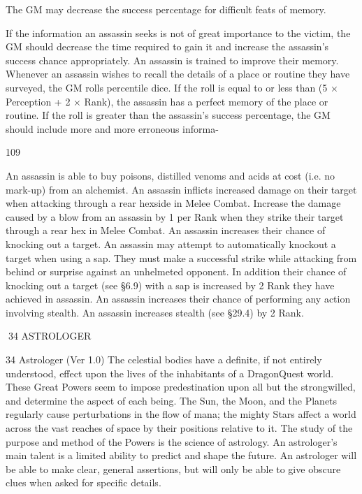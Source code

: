 \documentclass[a4paper]{article}
\begin{document}
\begin{multicols}{3}
The GM may decrease the success percentage for
difficult feats of memory.

If the information an assassin seeks is not of great
importance to the victim, the GM should decrease
the time required to gain it and increase the assassin’s success chance appropriately.
An assassin is trained to improve their memory.
Whenever an assassin wishes to recall the details of
a place or routine they have surveyed, the GM rolls
percentile dice. If the roll is equal to or less than (5
× Perception + 2 × Rank), the assassin has a perfect
memory of the place or routine. If the roll is greater
than the assassin’s success percentage, the GM
should include more and more erroneous informa-

109

An assassin is able to buy poisons, distilled venoms and acids at cost (i.e. no mark-up) from an
alchemist.
An assassin inflicts increased damage on their
target when attacking through a rear hexside in
Melee Combat.
Increase the damage caused by a blow from an
assassin by 1 per Rank when they strike their target
through a rear hex in Melee Combat.
An assassin increases their chance of knocking
out a target.
An assassin may attempt to automatically knockout
a target when using a sap. They must make a successful strike while attacking from behind or surprise against an unhelmeted opponent.
In addition their chance of knocking out a target
(see §6.9) with a sap is increased by 2%
Rank they have achieved in assassin.
An assassin increases their chance of performing any action involving stealth.
An assassin increases stealth (see §29.4) by 2%
Rank.

34 ASTROLOGER

34 Astrologer (Ver 1.0)
The celestial bodies have a definite, if not entirely
understood, effect upon the lives of the inhabitants
of a DragonQuest world. These Great Powers seem
to impose predestination upon all but the strongwilled, and determine the aspect of each being. The
Sun, the Moon, and the Planets regularly cause
perturbations in the flow of mana; the mighty Stars
affect a world across the vast reaches of space by
their positions relative to it. The study of the purpose and method of the Powers is the science of
astrology.
An astrologer’s main talent is a limited ability to
predict and shape the future. An astrologer will be
able to make clear, general assertions, but will only
be able to give obscure clues when asked for specific details.


\end{multicols}
\end{document}
